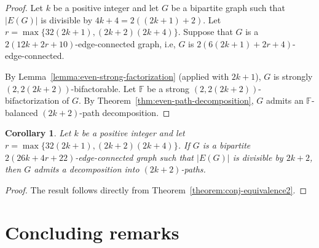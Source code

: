 \documentclass[12pt,reqno,a4paper]{amsart}
\newtheorem{corollary}[theorem]{Corollary}
\begin{document}
\begin{proof}
	Let \(k\) be a positive integer and let \(G\) be a bipartite graph 
	such that \(|E(G)|\) is divisible by \(4k+4=2((2k+1)+2)\). Let \(r = 
\max\{32(2k+1),(2k+2)(2k+4)\}\). Suppose that $G$ is a \(2(12k + 2r + 
10)\)-edge-connected 	graph, i.e, $G$ is $2(6(2k+1)+2r+4)$-edge-connected.
	
	By Lemma~\ref{lemma:even-strong-factorization} (applied with \(2k+1\)), \(G\) is strongly \((2,2(2k+2))\)-bifactorable.
	Let \(\mathbb{F}\) be a strong \((2,2(2k+2))\)-bifactorization of 
\(G\).
	By Theorem~\ref{thm:even-path-decomposition}, \(G\) 
admits an \(\mathbb{F}\)-balanced $(2k+2)$-path decomposition.
\end{proof}


\begin{corollary}
Let \(k\) be a positive integer and let \(r = 
\max\{32(2k+1),(2k+2)(2k+4)\}\). If \(G\) is a bipartite 
\(2(26k + 4r + 22)\)-edge-connected graph such that \(|E(G)|\) is divisible by 
\(2k+2\),
	then \(G\) admits a decomposition into \((2k+2)\)-paths.
\end{corollary}

\begin{proof}
The result follows directly from Theorem~\ref{theorem:conj-equivalence2}.
\end{proof}

\section{Concluding remarks}
\end{document}
